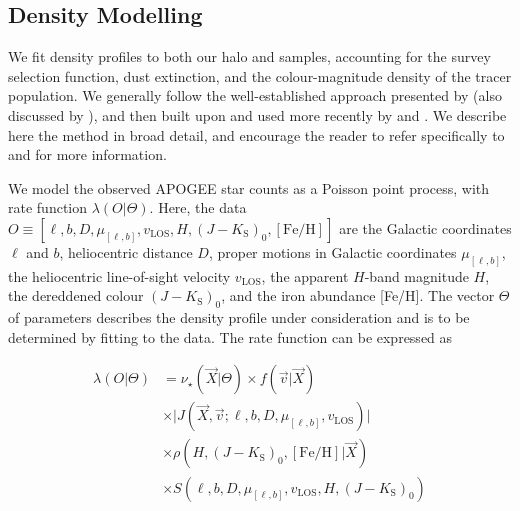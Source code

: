 \subsection{Density Modelling}

We fit density profiles to both our halo and \gse samples, accounting for the survey selection function, dust extinction, and the colour-magnitude density of the tracer population. We generally follow the well-established approach presented by \textcite{bovy12d} (also discussed by \textcite{rix13}), and then built upon and used more recently by \textcite{bovy16a,bovy16b,mackereth17,horta21b} and \cite{mackereth20}. We describe here the method in broad detail, and encourage the reader to refer specifically to \textcite{bovy12d,bovy16a} and \cite{mackereth20} for more information.

We model the observed APOGEE star counts as a Poisson point process, with rate function $\lambda(O \vert \Theta)$. Here, the data $O \equiv [\ell, b, D, \mu_{[\ell,b]}, v_\mathrm{LOS}, H, (J-K_\mathrm{S})_{0}, [\mathrm{Fe/H}]]$ are the Galactic coordinates $\ell$ and $b$, heliocentric distance $D$, proper motions in Galactic coordinates $\mu_{[\ell,b]}$, the heliocentric line-of-sight velocity $v_\mathrm{LOS}$, the apparent $H$-band magnitude $H$, the dereddened colour $(J-K_\mathrm{S})_{0}$, and the iron abundance [Fe/H]. The vector $\Theta$ of parameters describes the density profile under consideration and is to be determined by fitting to the data. The rate function can be expressed as

\begin{equation}
\label{ch3:eq:rate}
\begin{split}
	\lambda(O \vert \Theta) & = \nu_{\star}(\vec{X} \vert \Theta) \times f(\vec{v} \vert \vec{X}) \\
	& \times \vert J(\vec{X}, \vec{v}; \ell, b, D, \mu_{[\ell,b]}, v_\mathrm{LOS}) \vert \\
	& \times \rho(H, (J-K_\mathrm{S})_{0}, [\mathrm{Fe/H}] \vert \vec{X}) \\
	& \times S(\ell, b, D, \mu_{[\ell,b]}, v_\mathrm{LOS}, H, (J-K_\mathrm{S})_{0})
\end{split}
\end{equation}

